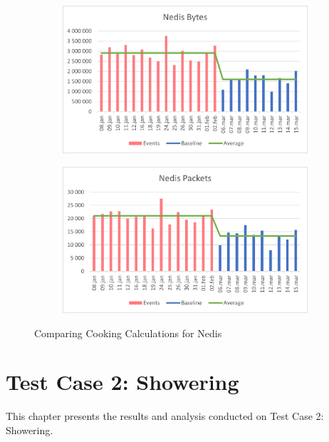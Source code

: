 \begin{figure}[H]
    \centering
    \begin{subfigure}{0.49\textwidth}
        \centering
        \includegraphics[width=1\hsize]{figures/Nedis_Comparing_Cooking_Calculations_Bytes.png} 
    \end{subfigure}
    \begin{subfigure}{0.49\textwidth}
        \centering
        \includegraphics[width=1\hsize]{figures/Nedis_Comparing_Cooking_Calculations_Packets.png} 
    \end{subfigure}
    \caption{Comparing Cooking Calculations for Nedis}
    \label{fig:NedisComparingCookingCalculations}
\end{figure}

\newpage
\section{Test Case 2: Showering}
This chapter presents the results and analysis conducted on Test Case 2: Showering. 
